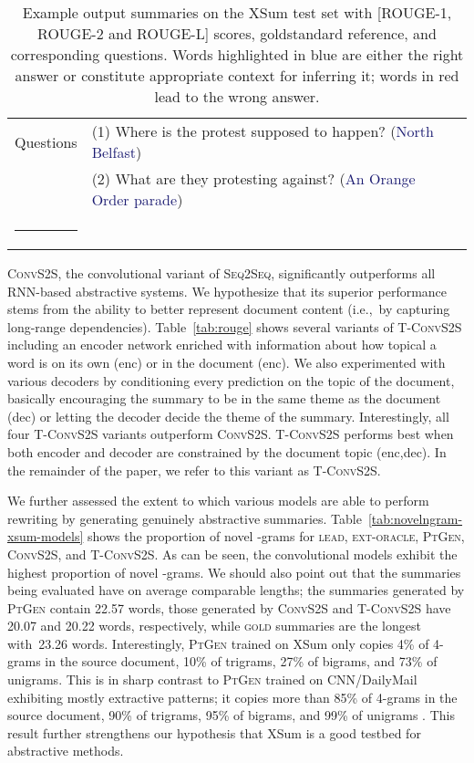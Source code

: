 \documentclass[11pt,a4paper]{article}
\makeatletter
\newcommand{\thickhline}{\noalign {\ifnum 0=`}\fi \hrule height 1pt
    \futurelet \reserved@a \@xhline
}
\makeatother
\begin{document}
\begin{table*}[t!]
{\begin{tabular}{l p{10.5cm} l}
      Questions &(1) {Where is the protest supposed to happen?}
      (\textcolor{midnightblue}{North Belfast}) \\ 
&(2) {What are they protesting against?} (\textcolor{midnightblue}{An Orange Order parade}) \\
      \thickhline

    \end{tabular}     
  }
  \caption{Example output summaries on the XSum test set with [ROUGE-1,
    ROUGE-2 and ROUGE-L] scores, goldstandard reference, and
    corresponding questions. Words highlighted in blue are either the
    right answer or constitute appropriate context for inferring it;
    words in red lead to the wrong
    answer. }\label{tab:erroranalysis}
\end{table*}


\textsc{ConvS2S}, the convolutional variant of \textsc{Seq2Seq},
significantly outperforms all \mbox{RNN-based} abstractive systems. We
hypothesize that its superior performance stems from the ability to
better represent document content (i.e.,~by capturing long-range
dependencies).
Table~\ref{tab:rouge} shows several variants of \textsc{T-ConvS2S}
including an encoder network enriched with information about how
topical a word is on its own (enc) or in the document
(enc).  We also experimented with various decoders by
conditioning every prediction on the topic of the document, basically
encouraging the summary to be in the same theme as the document
(dec) or letting the decoder decide the theme of the
summary. Interestingly, all four \textsc{T-ConvS2S} variants
outperform \textsc{ConvS2S}. \textsc{T-ConvS2S} performs best when
both encoder and decoder are constrained by the document topic
(enc,dec). In the remainder of the paper, we
refer to this variant as \textsc{T-ConvS2S}.

We further assessed the extent to which various models are able to
perform rewriting by generating genuinely abstractive
summaries. Table~\ref{tab:novelngram-xsum-models} shows the proportion
of novel -grams for \textsc{lead}, \textsc{ext-oracle},
\textsc{PtGen}, \textsc{ConvS2S}, and \textsc{T-ConvS2S}.  As can be
seen, the convolutional models exhibit the highest proportion of novel
-grams. We should also point out that the summaries being evaluated
have on average comparable lengths; the summaries generated by
\textsc{PtGen} contain 22.57 words, those generated by
\textsc{ConvS2S} and \textsc{T-ConvS2S} have 20.07 and 20.22 words,
respectively, while \textsc{gold} summaries are the longest with~23.26
words.  Interestingly, \textsc{PtGen} trained on XSum only copies 4\%
of 4-grams in the source document, 10\% of trigrams, 27\% of bigrams,
and 73\% of unigrams. This is in sharp contrast to \textsc{PtGen}
trained on CNN/DailyMail exhibiting mostly extractive patterns; it
copies more than 85\% of 4-grams in the source document, 90\% of
trigrams, 95\% of bigrams, and 99\% of unigrams \cite{see-acl17}. This
result further strengthens our hypothesis that XSum is a good testbed
for abstractive methods.
\end{document}
